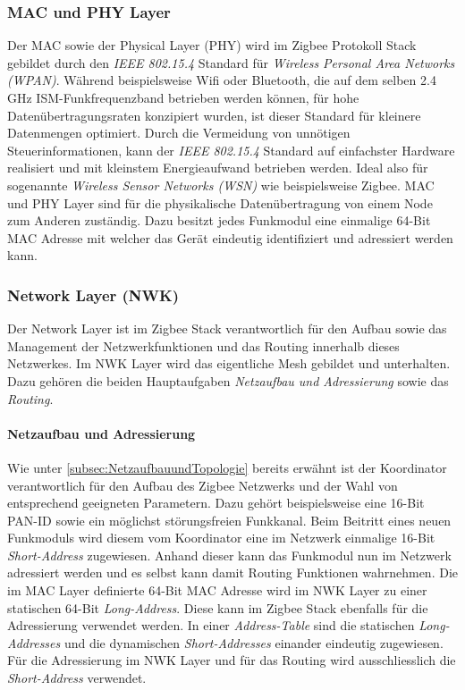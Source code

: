 \subsubsection{MAC und PHY Layer}\label{subsubsec:MACundPHYLayer}
Der MAC sowie der Physical Layer (PHY) wird im Zigbee Protokoll Stack gebildet durch den \textit{IEEE 802.15.4} Standard für \textit{Wireless Personal Area Networks (WPAN)}.
Während beispielsweise Wifi oder Bluetooth, die auf dem selben 2.4 GHz ISM-Funkfrequenzband betrieben werden können, für hohe Datenübertragungsraten konzipiert wurden, ist dieser Standard für kleinere Datenmengen optimiert.
Durch die Vermeidung von unnötigen Steuerinformationen, kann der \textit{IEEE 802.15.4} Standard auf einfachster Hardware realisiert und mit kleinstem Energieaufwand betrieben werden.
Ideal also für sogenannte \textit{Wireless Sensor Networks (WSN)} wie beispielsweise Zigbee.
MAC und PHY Layer sind für die physikalische Datenübertragung von einem Node zum Anderen zuständig.
Dazu besitzt jedes Funkmodul eine einmalige 64-Bit MAC Adresse mit welcher das Gerät eindeutig identifiziert und adressiert werden kann. \cite{markus_krause_rainer_konrad_ieee_2014}


\subsubsection{Network Layer (NWK)}\label{subsubsec:Network Layer}
Der Network Layer ist im Zigbee Stack verantwortlich für den Aufbau sowie das Management der Netzwerkfunktionen und das Routing innerhalb dieses Netzwerkes.
Im NWK Layer wird das eigentliche Mesh gebildet und unterhalten. Dazu gehören die beiden Hauptaufgaben \textit{Netzaufbau und Adressierung} sowie das \textit{Routing}.

\paragraph{Netzaufbau und Adressierung}
Wie unter \ref{subsec:NetzaufbauundTopologie} bereits erwähnt ist der Koordinator verantwortlich für den Aufbau des Zigbee Netzwerks und der Wahl von entsprechend geeigneten Parametern.
Dazu gehört beispielsweise eine 16-Bit PAN-ID sowie ein möglichst störungsfreien Funkkanal.
Beim Beitritt eines neuen Funkmoduls wird diesem vom Koordinator eine im Netzwerk einmalige 16-Bit \textit{Short-Address} zugewiesen.
Anhand dieser kann das Funkmodul nun im Netzwerk adressiert werden und es selbst kann damit Routing Funktionen wahrnehmen.
Die im MAC Layer definierte 64-Bit MAC Adresse wird im NWK Layer zu einer statischen 64-Bit \textit{Long-Address}.
Diese kann im Zigbee Stack ebenfalls für die Adressierung verwendet werden.
In einer \textit{Address-Table} sind die statischen \textit{Long-Addresses} und die dynamischen \textit{Short-Addresses} einander eindeutig zugewiesen.
Für die Adressierung im NWK Layer und für das Routing wird ausschliesslich die \textit{Short-Address} verwendet.

